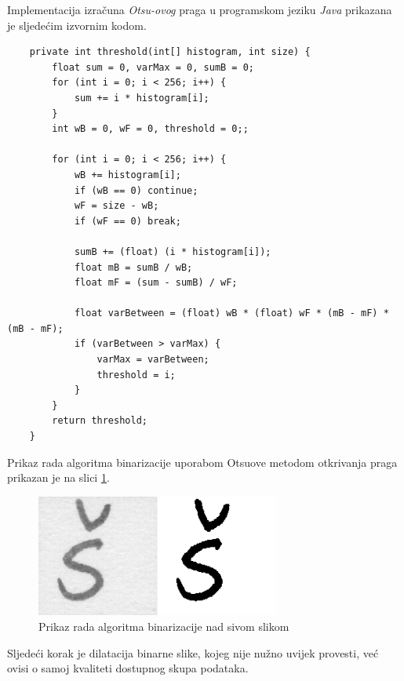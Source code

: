 Implementacija izračuna \emph{Otsu-ovog} praga u programskom jeziku \emph{Java} prikazana je sljedećim izvornim kodom.
\lstset{language=Java, tabsize=2}
\begin{lstlisting}
    private int threshold(int[] histogram, int size) {
        float sum = 0, varMax = 0, sumB = 0;
        for (int i = 0; i < 256; i++) {
            sum += i * histogram[i];
        }
        int wB = 0, wF = 0, threshold = 0;;

        for (int i = 0; i < 256; i++) {
            wB += histogram[i];
            if (wB == 0) continue;
            wF = size - wB;
            if (wF == 0) break;

            sumB += (float) (i * histogram[i]);
            float mB = sumB / wB;
            float mF = (sum - sumB) / wF;

            float varBetween = (float) wB * (float) wF * (mB - mF) * (mB - mF);
            if (varBetween > varMax) {
                varMax = varBetween;
                threshold = i;
            }
        }
        return threshold;
    }
\end{lstlisting}

Prikaz rada algoritma binarizacije uporabom Otsuove metodom otkrivanja praga prikazan je na slici \ref{fig:binarization_example}.

\begin{figure}[htb]
    \centering
    \includegraphics[width=8cm]{images/binarization_example.png}
    \caption{Prikaz rada algoritma binarizacije nad sivom slikom}
    \label{fig:binarization_example}
\end{figure}

Sljedeći korak je dilatacija binarne slike, kojeg nije nužno uvijek provesti, već ovisi o samoj kvaliteti dostupnog skupa podataka.

